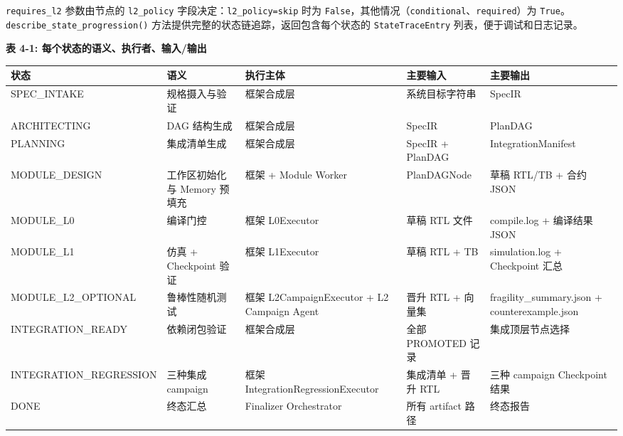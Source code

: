 \texttt{requires\_l2} 参数由节点的 \texttt{l2\_policy}
字段决定：\texttt{l2\_policy=\textquotesingle{}skip\textquotesingle{}}
时为
\texttt{False}，其他情况（\texttt{conditional}、\texttt{required}）为
\texttt{True}。\texttt{describe\_state\_progression()}
方法提供完整的状态链追踪，返回包含每个状态的 \texttt{StateTraceEntry}
列表，便于调试和日志记录。

\textbf{表 4-1: 每个状态的语义、执行者、输入/输出}

{\def\LTcaptype{none} %
\begin{longtable}[]{@{}
  >{\raggedright\arraybackslash}p{}
  >{\raggedright\arraybackslash}p{}
  >{\raggedright\arraybackslash}p{}
  >{\raggedright\arraybackslash}p{}
  >{\raggedright\arraybackslash}p{}@{}}
\toprule\noalign{}
\begin{minipage}[b]{\linewidth}\raggedright
状态
\end{minipage} & \begin{minipage}[b]{\linewidth}\raggedright
语义
\end{minipage} & \begin{minipage}[b]{\linewidth}\raggedright
执行主体
\end{minipage} & \begin{minipage}[b]{\linewidth}\raggedright
主要输入
\end{minipage} & \begin{minipage}[b]{\linewidth}\raggedright
主要输出
\end{minipage} \\
\midrule\noalign{}
\endhead
\bottomrule\noalign{}
\endlastfoot
SPEC\_INTAKE & 规格摄入与验证 & 框架合成层 & 系统目标字符串 & SpecIR \\
ARCHITECTING & DAG 结构生成 & 框架合成层 & SpecIR & PlanDAG \\
PLANNING & 集成清单生成 & 框架合成层 & SpecIR + PlanDAG &
IntegrationManifest \\
MODULE\_DESIGN & 工作区初始化与 Memory 预填充 & 框架 + Module Worker &
PlanDAGNode & 草稿 RTL/TB + 合约 JSON \\
MODULE\_L0 & 编译门控 & 框架 L0Executor & 草稿 RTL 文件 & compile.log +
编译结果 JSON \\
MODULE\_L1 & 仿真 + Checkpoint 验证 & 框架 L1Executor & 草稿 RTL + TB &
simulation.log + Checkpoint 汇总 \\
MODULE\_L2\_OPTIONAL & 鲁棒性随机测试 & 框架 L2CampaignExecutor + L2
Campaign Agent & 晋升 RTL + 向量集 & fragility\_summary.json +
counterexample.json \\
INTEGRATION\_READY & 依赖闭包验证 & 框架合成层 & 全部 PROMOTED 记录 &
集成顶层节点选择 \\
INTEGRATION\_REGRESSION & 三种集成 campaign & 框架
IntegrationRegressionExecutor & 集成清单 + 晋升 RTL & 三种 campaign
Checkpoint 结果 \\
DONE & 终态汇总 & Finalizer Orchestrator & 所有 artifact 路径 &
终态报告 \\
\end{longtable}
}

